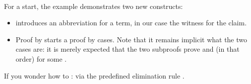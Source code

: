 \begin{isabellebody}
\ \ \isamarkupfalse%
\isanewline
{}\isamarkupfalse%
%
\endisatagproof
{\isafoldproof}%
%
\isadelimproof
%
\endisadelimproof
%
\begin{isamarkuptext}%
\noindent
For a start, the example demonstrates two new constructs:
\begin{itemize}
\item {} introduces an abbreviation for a term, in our case
the witness for the claim.
\item Proof by  starts a proof by cases. Note that it remains
implicit what the two cases are: it is merely expected that the two subproofs
prove  and  (in that order)
for some .
\end{itemize}
If you wonder how to  :
via the predefined elimination rule .


\end{isamarkuptext}
\end{isabellebody}
